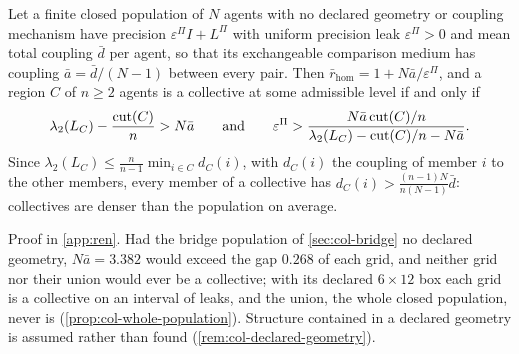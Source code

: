 \begin{proposition}\label{prop:ren-exchangeable}
Let a finite closed population of $N$ agents with no declared geometry or coupling mechanism have precision $\varepsilon^\Pi I+L^\Pi$ with uniform precision leak $\varepsilon^\Pi>0$ and mean total coupling $\bar d$ per agent, so that its exchangeable comparison medium has coupling $\bar a=\bar d/(N-1)$ between every pair. Then $\bar r_{\mathrm{hom}}=1+N\bar a/\varepsilon^\Pi$, and a region $C$ of $n\ge2$ agents is a collective at some admissible level if and only if
\begin{equation}\label{eq:ren-exchangeable}
\lambda_2(L_C)-\frac{\operatorname{cut}(C)}n>N\bar a\qquad\text{and}\qquad\varepsilon^\Pi>\frac{N\bar a\operatorname{cut}(C)/n}{\lambda_2(L_C)-\operatorname{cut}(C)/n-N\bar a}.
\end{equation}
Since $\lambda_2(L_C)\le\frac n{n-1}\min_{i\in C}d_C(i)$, with $d_C(i)$ the coupling of member $i$ to the other members, every member of a collective has $d_C(i)>\frac{(n-1)N}{n(N-1)}\bar d$: collectives are denser than the population on average.
\end{proposition}
Proof in \cref{app:ren}. Had the bridge population of \cref{sec:col-bridge} no declared geometry, $N\bar a=3.382$ would exceed the gap $0.268$ of each grid, and neither grid nor their union would ever be a collective; with its declared $6\times12$ box each grid is a collective on an interval of leaks, and the union, the whole closed population, never is (\cref{prop:col-whole-population}). Structure contained in a declared geometry is assumed rather than found (\cref{rem:col-declared-geometry}).

